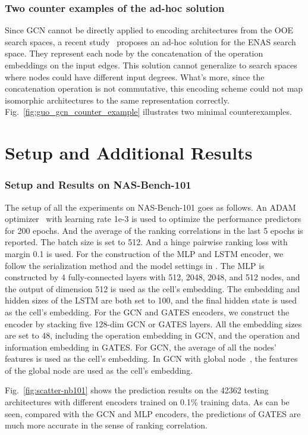 \documentclass[runningheads]{llncs}
\begin{document}
\subsubsection{Two counter examples of the ad-hoc solution~\cite{guo2019nat}}
Since GCN cannot be directly applied to encoding architectures from the OOE search spaces, a recent study~\cite{guo2019nat} proposes an ad-hoc solution for the ENAS search space. They represent each node by the concatenation of the operation embeddings on the input edges. This solution cannot generalize to search spaces where nodes could have different input degrees. What’s more, since the concatenation operation is not commutative, this encoding scheme could not map isomorphic architectures to the same representation correctly. Fig.~\ref{fig:guo_gcn_counter_example} illustrates two minimal counterexamples.

\section{Setup and Additional Results}

\subsubsection{Setup and Results on NAS-Bench-101}
The setup of all the experiments on NAS-Bench-101 goes as follows. An ADAM optimizer~\cite{kingma2014adam} with learning rate 1e-3 is used to optimize the performance predictors for 200 epochs. And the average of the ranking correlations in the last 5 epochs is reported. The batch size is set to 512. And a hinge pairwise ranking loss with margin 0.1 is used. For the construction of the MLP and LSTM encoder, we follow the serialization method and the model settings in \cite{wang2018alphax}. The MLP is constructed by 4 fully-connected layers with 512, 2048, 2048, and 512 nodes, and the output of dimension 512 is used as the cell's embedding. The embedding and hidden sizes of the LSTM are both set to 100, and the final hidden state is used as the cell's embedding. For the GCN and GATES encoders, we construct the encoder by stacking five 128-dim GCN or GATES layers. 
All the embedding sizes are set to 48, including the operation embedding in GCN, and the operation and information embedding in GATES. For GCN, the average of all the nodes' features is used as the cell's embedding. In GCN with global node~\cite{shi2019multi}, the features of the global node are used as the cell's embedding.

Fig.~\ref{fig:scatter-nb101} shows the prediction results on the 42362 testing architectures with different encoders trained on 0.1\% training data.
As can be seen, compared with the GCN and MLP encoders, the predictions of GATES are much more accurate in the sense of ranking correlation.
\end{document}
